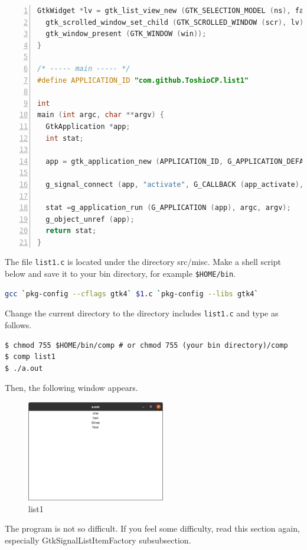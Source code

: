 \begin{lstlisting}[language=C, numbers=left]
  GtkWidget *lv = gtk_list_view_new (GTK_SELECTION_MODEL (ns), factory);
  gtk_scrolled_window_set_child (GTK_SCROLLED_WINDOW (scr), lv);
  gtk_window_present (GTK_WINDOW (win));
}

/* ----- main ----- */
#define APPLICATION_ID "com.github.ToshioCP.list1"

int
main (int argc, char **argv) {
  GtkApplication *app;
  int stat;

  app = gtk_application_new (APPLICATION_ID, G_APPLICATION_DEFAULT_FLAGS);

  g_signal_connect (app, "activate", G_CALLBACK (app_activate), NULL);

  stat =g_application_run (G_APPLICATION (app), argc, argv);
  g_object_unref (app);
  return stat;
}
\end{lstlisting}

The file \passthrough{\lstinline!list1.c!} is located under the
directory src/misc. Make a shell script below and save it to your bin
directory, for example \passthrough{\lstinline!$HOME/bin!}.

\begin{lstlisting}[language=bash]
gcc `pkg-config --cflags gtk4` $1.c `pkg-config --libs gtk4`
\end{lstlisting}

Change the current directory to the directory includes
\passthrough{\lstinline!list1.c!} and type as follows.

\begin{lstlisting}
$ chmod 755 $HOME/bin/comp # or chmod 755 (your bin directory)/comp
$ comp list1
$ ./a.out
\end{lstlisting}

Then, the following window appears.

\begin{figure}
\centering
\includegraphics[width=6.04cm,height=4.4cm]{../image/list1.png}
\caption{list1}
\end{figure}

The program is not so difficult. If you feel some difficulty, read this
section again, especially GtkSignalListItemFactory subsubsection.

